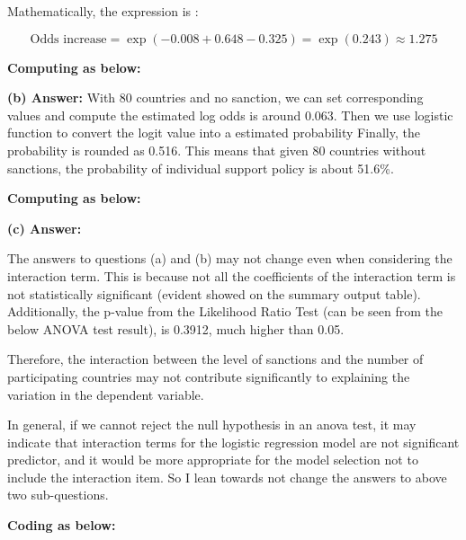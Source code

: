 \documentclass[12pt,letterpaper]{article}
\begin{document}
\begin{enumerate}
\begin{enumerate}
		Mathematically, the expression is : 
		
		\noindent  \[ \text{Odds increase} = \exp(-0.008 + 0.648 - 0.325) = \exp(0.243) \approx 1.275 \]
		
		\noindent
		\textbf{Computing as below:}
		
		
		
		\vspace{.15cm}
		
		\noindent \textbf{(b) Answer:}
		With 80 countries and no sanction, we can set corresponding values and compute the estimated log odds is around 0.063. Then we use logistic function to convert the logit value into a estimated probability Finally, the probability is rounded as 0.516. This means that given 80 countries without sanctions, the probability of individual support policy is about 51.6\%.
		
		\noindent
		\textbf{Computing as below:}
		
		
		
		\vspace{.15cm}
		
		
		\noindent \textbf{(c) Answer:}
		
				\noindent The answers to questions (a) and (b) may not  change even when considering the interaction term. This is because not all the coefficients of the interaction term is not statistically significant (evident showed on the summary output table). Additionally, the p-value from the Likelihood Ratio Test (can be seen from the below ANOVA test result), is 0.3912, much higher than 0.05. 
				
				Therefore, the interaction between the level of sanctions and the number of participating countries may not contribute significantly to explaining the variation in the dependent variable.
				
				In general, if we cannot reject the null hypothesis in an anova test, it may indicate that interaction terms for the logistic regression model are not significant predictor, and it would be more appropriate for the model selection not to include the interaction item. So I lean towards not change the answers to above two sub-questions.
		
			\vspace{.15cm}
				
		\textbf{Coding as below:}
		
		
		
		

\end{enumerate}
\end{enumerate}
\end{document}
